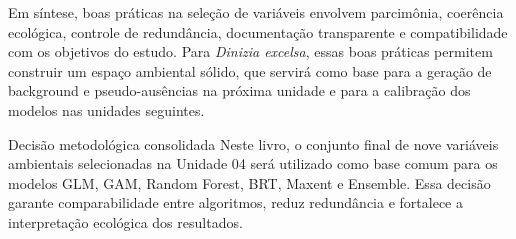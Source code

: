 Em síntese, boas práticas na seleção de variáveis envolvem parcimônia, coerência ecológica, controle de redundância, documentação transparente e compatibilidade com os objetivos do estudo. Para \textit{Dinizia excelsa}, essas boas práticas permitem construir um espaço ambiental sólido, que servirá como base para a geração de background e pseudo-ausências na próxima unidade e para a calibração dos modelos nas unidades seguintes.

\begin{caixaatencao}{Decisão metodológica consolidada}
	Neste livro, o conjunto final de nove variáveis ambientais selecionadas na Unidade 04 será utilizado como base comum para os modelos GLM, GAM, Random Forest, BRT, Maxent e Ensemble. Essa decisão garante comparabilidade entre algoritmos, reduz redundância e fortalece a interpretação ecológica dos resultados.
\end{caixaatencao}
